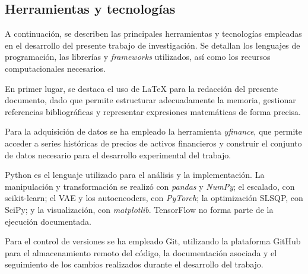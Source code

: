 \subsection{Herramientas y tecnologías}

A continuación, se describen las principales herramientas y tecnologías empleadas en el desarrollo del presente trabajo de investigación. Se detallan los lenguajes de programación, las librerías y \textit{frameworks} utilizados, así como los recursos computacionales necesarios.

En primer lugar, se destaca el uso de LaTeX para la redacción del presente documento, dado que permite estructurar adecuadamente la memoria, gestionar referencias bibliográficas y representar expresiones matemáticas de forma precisa.

Para la adquisición de datos se ha empleado la herramienta \textit{yfinance}, que permite acceder a series históricas de precios de activos financieros y construir el conjunto de datos necesario para el desarrollo experimental del trabajo.

Python es el lenguaje utilizado para el análisis y la implementación. La manipulación y transformación se realizó con \textit{pandas} y \textit{NumPy}; el escalado, con scikit-learn; el VAE y los autoencoders, con \textit{PyTorch}; la optimización SLSQP, con SciPy; y la visualización, con \textit{matplotlib}. TensorFlow no forma parte de la ejecución documentada.

Para el control de versiones se ha empleado Git, utilizando la plataforma GitHub para el almacenamiento remoto del código, la documentación asociada y el seguimiento de los cambios realizados durante el desarrollo del trabajo.
